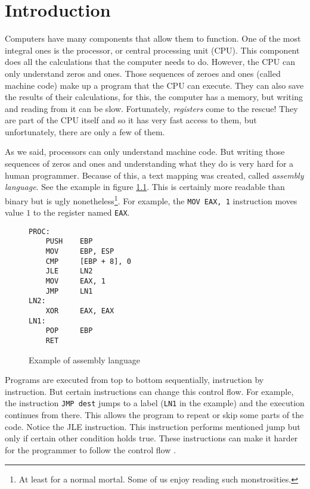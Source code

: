 \chapter{Introduction}
Computers have many components that allow them to function. One of the most
integral ones is the processor, or central processing unit (CPU). This
component does all the calculations that the computer needs to do. However, the
CPU can only understand zeros and ones. Those sequences of zeroes and ones
(called machine code) make up a program that the CPU can execute. They can also
save the results of their calculations, for this, the computer has a memory,
but writing and reading from it can be slow. Fortunately, \textit{registers}
come to the rescue! They are part of the CPU itself and so it has very fast
access to them, but unfortunately, there are only a few of them.

As we said, processors can only understand machine code. But writing those
sequences of zeros and ones and understanding what they do is very hard for a
human programmer. Because of this, a text mapping was created, called
\textit{assembly language}. See the example in figure
\ref{fig:assembly-example}. This is certainly more readable than binary but is
ugly nonetheless\footnote{At least for a normal mortal. Some of us enjoy
reading such monstrosities.}. For example, the \texttt{MOV EAX, 1} instruction
moves value $1$ to the register named \texttt{EAX}.

\begin{figure}\label{fig:assembly-example}
\begin{lstlisting}
PROC:
    PUSH    EBP
    MOV     EBP, ESP
    CMP     [EBP + 8], 0
    JLE     LN2
    MOV     EAX, 1
    JMP     LN1
LN2:
    XOR     EAX, EAX
LN1:
    POP     EBP
    RET
\end{lstlisting}
\caption{Example of assembly language}
\end{figure}

Programs are executed from top to bottom sequentially, instruction by
instruction. But certain instructions can change this control flow. For
example, the instruction \texttt{JMP dest} jumps to a label (\texttt{LN1} in
the example) and the execution continues from there. This allows the program to
repeat or skip some parts of the code. Notice the JLE instruction. This
instruction performs mentioned jump but only if certain other condition holds
true. These instructions can make it harder for the programmer to follow the
control flow \cite{gotobad}.


